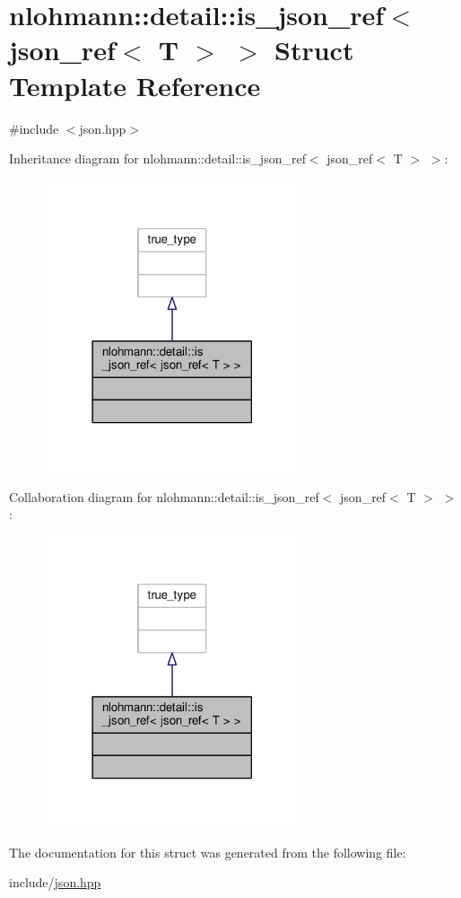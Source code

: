 \hypertarget{structnlohmann_1_1detail_1_1is__json__ref_3_01json__ref_3_01T_01_4_01_4}{}\section{nlohmann\+:\+:detail\+:\+:is\+\_\+json\+\_\+ref$<$ json\+\_\+ref$<$ T $>$ $>$ Struct Template Reference}
\label{structnlohmann_1_1detail_1_1is__json__ref_3_01json__ref_3_01T_01_4_01_4}


{\ttfamily \#include $<$json.\+hpp$>$}



Inheritance diagram for nlohmann\+:\+:detail\+:\+:is\+\_\+json\+\_\+ref$<$ json\+\_\+ref$<$ T $>$ $>$\+:
\nopagebreak
\begin{figure}[H]
\begin{center}
\leavevmode
\includegraphics[width=213pt]{structnlohmann_1_1detail_1_1is__json__ref_3_01json__ref_3_01T_01_4_01_4__inherit__graph}
\end{center}
\end{figure}


Collaboration diagram for nlohmann\+:\+:detail\+:\+:is\+\_\+json\+\_\+ref$<$ json\+\_\+ref$<$ T $>$ $>$\+:
\nopagebreak
\begin{figure}[H]
\begin{center}
\leavevmode
\includegraphics[width=213pt]{structnlohmann_1_1detail_1_1is__json__ref_3_01json__ref_3_01T_01_4_01_4__coll__graph}
\end{center}
\end{figure}


The documentation for this struct was generated from the following file\+:\begin{DoxyCompactItemize}
\item 
include/\hyperlink{json_8hpp}{json.\+hpp}\end{DoxyCompactItemize}
